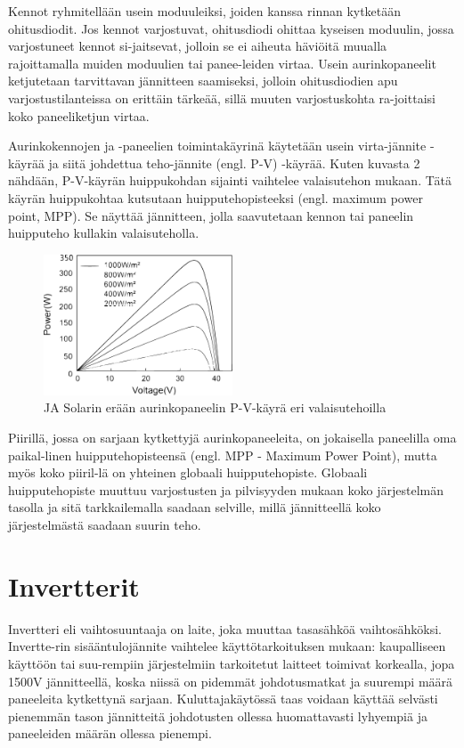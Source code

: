   Kennot ryhmitellään usein moduuleiksi, joiden kanssa rinnan kytketään ohitusdiodit. Jos kennot varjostuvat, ohitusdiodi ohittaa kyseisen moduulin, jossa varjostuneet kennot si-jaitsevat, jolloin se ei aiheuta häviöitä muualla rajoittamalla muiden moduulien tai panee-leiden virtaa. Usein aurinkopaneelit ketjutetaan tarvittavan jännitteen saamiseksi, jolloin ohitusdiodien apu varjostustilanteissa on erittäin tärkeää, sillä muuten varjostuskohta ra-joittaisi koko paneeliketjun virtaa. 

  Aurinkokennojen ja -paneelien toimintakäyrinä käytetään usein virta-jännite -käyrää ja siitä johdettua teho-jännite (engl. P-V) -käyrää. Kuten kuvasta 2 nähdään, P-V-käyrän huippukohdan sijainti vaihtelee valaisutehon mukaan. Tätä käyrän huippukohtaa kutsutaan huipputehopisteeksi (engl. maximum power point, MPP). Se näyttää jännitteen, jolla saavutetaan kennon tai paneelin huipputeho kullakin valaisuteholla.
  \begin{figure}
    \centering
    \includegraphics[width=0.5\textwidth]{figures/pvcurve}
    \caption{JA Solarin erään aurinkopaneelin P-V-käyrä eri valaisutehoilla}
  \end{figure}
  Piirillä, jossa on sarjaan kytkettyjä aurinkopaneeleita, on jokaisella paneelilla oma paikal-linen huipputehopisteensä (engl. MPP - Maximum Power Point), mutta myös koko piiril-lä on yhteinen globaali huipputehopiste. Globaali huipputehopiste muuttuu varjostusten ja pilvisyyden mukaan koko järjestelmän tasolla ja sitä tarkkailemalla saadaan selville, millä jännitteellä koko järjestelmästä saadaan suurin teho.

\section{Invertterit}
  Invertteri eli vaihtosuuntaaja on laite, joka muuttaa tasasähköä vaihtosähköksi. Invertte-rin sisääntulojännite vaihtelee käyttötarkoituksen mukaan: kaupalliseen käyttöön tai suu-rempiin järjestelmiin tarkoitetut laitteet toimivat korkealla, jopa 1500V jännitteellä, koska niissä on pidemmät johdotusmatkat ja suurempi määrä paneeleita kytkettynä sarjaan. Kuluttajakäytössä taas voidaan käyttää selvästi pienemmän tason jännitteitä johdotusten ollessa huomattavasti lyhyempiä ja paneeleiden määrän ollessa pienempi. 

